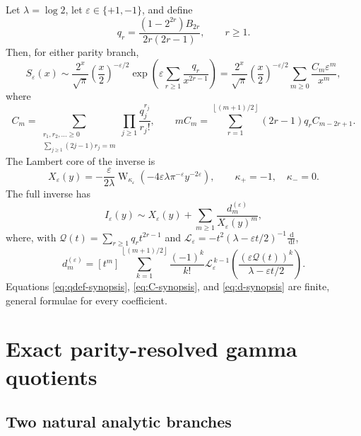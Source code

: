 \documentclass[11pt]{article}
\theoremstyle{definition}
\theoremstyle{remark}
\newcommand{\eps}{\varepsilon}
\newcommand{\lam}{\lambda}
\newcommand{\dd}{\,\mathrm d}
\newcommand{\Qf}{\mathcal Q}
\newcommand{\floor}[1]{\left\lfloor #1\right\rfloor}
\newcommand{\W}{\operatorname{W}}
\begin{document}
\begin{mainbox}
Let $\lam=\log2$, let $\eps\in\{+1,-1\}$, and define
\begin{equation}\label{eq:qdef-synopsis}
 q_r=\frac{(1-2^{2r})B_{2r}}{2r(2r-1)},\qquad r\ge1.
\end{equation}
Then, for either parity branch,
\begin{equation}\label{eq:forward-synopsis}
 S_\eps(x)\sim
 \frac{2^x}{\sqrt\pi}\left(\frac{x}{2}\right)^{-\eps/2}
 \exp\!\left(\eps\sum_{r\ge1}\frac{q_r}{x^{2r-1}}\right)
 =\frac{2^x}{\sqrt\pi}\left(\frac{x}{2}\right)^{-\eps/2}
 \sum_{m\ge0}\frac{C_m\eps^m}{x^m},
\end{equation}
where
\begin{equation}\label{eq:C-synopsis}
 C_m=\sum_{\substack{r_1,r_2,\ldots\ge0\\
             \sum_{j\ge1}(2j-1)r_j=m}}
       \prod_{j\ge1}\frac{q_j^{r_j}}{r_j!},
 \qquad
 mC_m=\sum_{r=1}^{\floor{(m+1)/2}}(2r-1)q_rC_{m-2r+1}.
\end{equation}
The Lambert core of the inverse is
\begin{equation}\label{eq:X-synopsis}
 X_\eps(y)=-\frac{\eps}{2\lam}
 \W_{\kappa_\eps}\!\left(-4\eps\lam\pi^{-\eps}y^{-2\eps}\right),
 \qquad \kappa_+=-1,\quad\kappa_-=0.
\end{equation}
The full inverse has
\begin{equation}\label{eq:inverse-synopsis}
 I_\eps(y)\sim X_\eps(y)+\sum_{m\ge1}\frac{d_m^{(\eps)}}{X_\eps(y)^m},
\end{equation}
where, with $\Qf(t)=\sum_{r\ge1}q_rt^{2r-1}$ and
$\mathcal L_\eps=-t^2(\lam-\eps t/2)^{-1}\frac{\dd}{\dd t}$,
\begin{equation}\label{eq:d-synopsis}
 d_m^{(\eps)}=
 [t^m]\sum_{k=1}^{\floor{(m+1)/2}}\frac{(-1)^k}{k!}
 \mathcal L_\eps^{\,k-1}
 \left(\frac{(\eps\Qf(t))^k}{\lam-\eps t/2}\right).
\end{equation}
Equations \eqref{eq:qdef-synopsis}, \eqref{eq:C-synopsis}, and \eqref{eq:d-synopsis} are finite, general formulae for every coefficient.
\end{mainbox}

\section{Exact parity-resolved gamma quotients}

\subsection{Two natural analytic branches}
\end{document}
